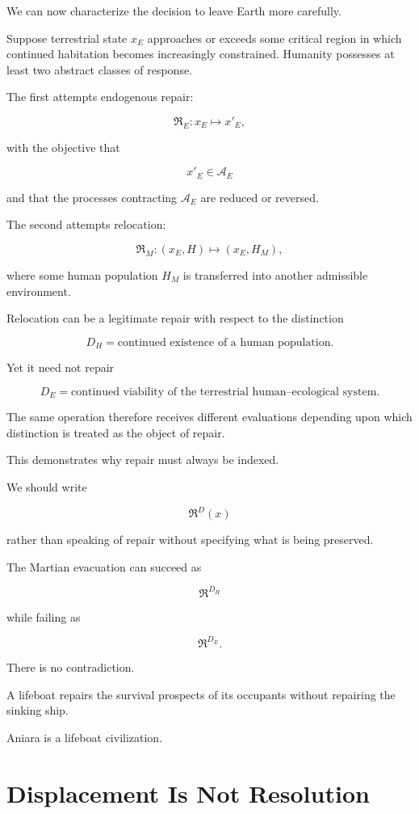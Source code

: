 \documentclass[11pt,oneside]{book}
\theoremstyle{definition}
\theoremstyle{remark}
\newcommand{\A}{\mathcal{A}}
\newcommand{\Repair}{\mathfrak{R}}
\begin{document}
We can now characterize the decision to leave Earth more carefully.

Suppose terrestrial state \(x_E\) approaches or exceeds some critical region in which continued habitation becomes increasingly constrained. Humanity possesses at least two abstract classes of response.

The first attempts endogenous repair:

\[
\Repair_E:
x_E
\mapsto
x'_E,
\]

with the objective that

\[
x'_E\in\A_E
\]

and that the processes contracting \(\A_E\) are reduced or reversed.

The second attempts relocation:

\[
\Repair_M:
(x_E,H)
\mapsto
(x_E,H_M),
\]

where some human population \(H_M\) is transferred into another admissible environment.

Relocation can be a legitimate repair with respect to the distinction

\[
D_H=\text{continued existence of a human population}.
\]

Yet it need not repair

\[
D_E=\text{continued viability of the terrestrial human--ecological system}.
\]

The same operation therefore receives different evaluations depending upon which distinction is treated as the object of repair.

This demonstrates why repair must always be indexed.

We should write

\[
\Repair^{D}(x)
\]

rather than speaking of repair without specifying what is being preserved.

The Martian evacuation can succeed as

\[
\Repair^{D_H}
\]

while failing as

\[
\Repair^{D_E}.
\]

There is no contradiction.

A lifeboat repairs the survival prospects of its occupants without repairing the sinking ship.

Aniara is a lifeboat civilization.

\section{Displacement Is Not Resolution}
\end{document}
